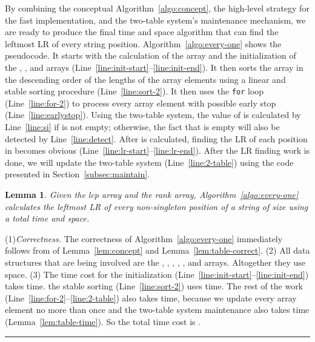 \documentclass[preprint]{elsarticle}
\newtheorem{lemma}{Lemma}[section]
\newcommand{\qedsymb}{\hfill{\rule{2mm}{2mm}}}
\newenvironment{proofsketch}{\begin{trivlist}
\item[\hspace{\labelsep}{\noindent Proof Sketch: }]
}{\qedsymb\end{trivlist}}
\begin{document}
By combining the conceptual Algorithm~\ref{algo:concept}, the
high-level strategy for the fast implementation, and the two-table
system's maintenance mechanism, we are ready to produce the final
 time and space algorithm that can find the leftmost LR of every
string position. Algorithm~\ref{algo:every-one} shows the pseudocode.
It starts with the calculation of the  array and the
initialization of the , , and  arrays
(Line~\ref{line:init-start}--\ref{line:init-end}).  It then sorts the
 array in the descending order of the lengths of the array
elements using a linear and stable sorting procedure
(Line~\ref{line:sort-2}). It then uses the {\tt for} loop
(Line~\ref{line:for-2}) to process every  array element with
possible early stop (Line~\ref{line:earlystop}).  Using the two-table
system, the value of  is calculated by Line~\ref{line:si} if
 is not empty; otherwise, the fact that  is empty will also
be detected by Line~\ref{line:detect}. After  is calculated,
finding the LR of each position in  becomes obvious
(Line~\ref{line:lr-start}--\ref{line:lr-end}). After the LR finding
work is done, we will update the two-table system (Line~\ref{line:2-table}) using
the code presented in Section~\ref{subsec:maintain}.





\begin{lemma}
\label{lem:every-one}  
Given the lcp array and the rank array, Algorithm~\ref{algo:every-one}
calculates the leftmost LR of every non-singleton position of a string 
of size  using a total  time and space.
\end{lemma}

\begin{proofsketch}
  (1)\emph{Correctness.} The correctness of Algorithm~\ref{algo:every-one} immediately
  follows from of Lemma~\ref{lem:concept} and
  Lemma~\ref{lem:table-correct}.  (2) All data structures that are
  being involved are the , , , , , and
   arrays.  Altogether they use  space.  (3) The time cost
  for the initialization
  (Line~\ref{line:init-start}--\ref{line:init-end}) takes  time.
  the stable sorting (Line~\ref{line:sort-2}) uses  time.  The
  rest of the work (Line~\ref{line:for-2}--\ref{line:2-table}) also
  takes  time, because we update every  array element no
  more than once and the two-table system maintenance also takes
   time (Lemma~\ref{lem:table-time}). So the total time cost
  is .
\end{proofsketch}
\end{document}
